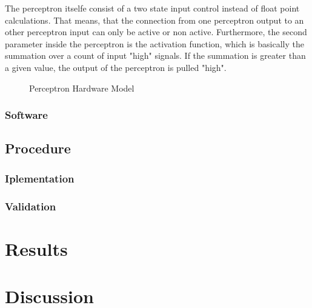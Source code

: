 \documentclass{report}
\numberwithin{equation}{section}
\begin{document}
The perceptron itselfe consist of a two state input control instead of float point calculations. That
means, that the connection from one perceptron output to an other perceptron input can only be active
or non active. Furthermore, the second parameter inside the perceptron is the activation function, which
is basically the summation over a count of input "high" signals. If the summation is greater than a given
value, the output of the perceptron is pulled "high".

\begin{figure}[htbp]
    \begin{center}
        \begin{tikzpicture} [>=latex', node distance = 2cm]

        \end{tikzpicture}
        \caption{Perceptron Hardware Model}
        \label{fig:perceptronHardwareModel}
    \end{center}
\end{figure}

\subsection{Software}
\section{Procedure}

\subsection{Iplementation}

\subsection{Validation}

\chapter{Results}

\chapter{Discussion}



\end{document}
